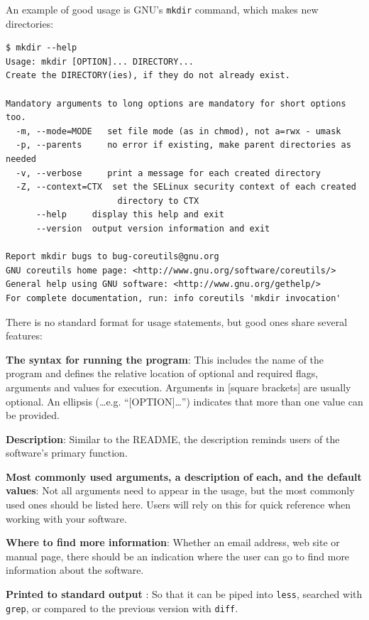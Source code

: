 \documentclass[10pt,letterpaper]{article}
\begin{document}
An example of good usage is GNU's \texttt{mkdir} command, which makes
new directories:

\begin{small}
\begin{verbatim}
$ mkdir --help
Usage: mkdir [OPTION]... DIRECTORY...
Create the DIRECTORY(ies), if they do not already exist.

Mandatory arguments to long options are mandatory for short options too.
  -m, --mode=MODE   set file mode (as in chmod), not a=rwx - umask
  -p, --parents     no error if existing, make parent directories as needed
  -v, --verbose     print a message for each created directory
  -Z, --context=CTX  set the SELinux security context of each created
                      directory to CTX
      --help     display this help and exit
      --version  output version information and exit

Report mkdir bugs to bug-coreutils@gnu.org
GNU coreutils home page: <http://www.gnu.org/software/coreutils/>
General help using GNU software: <http://www.gnu.org/gethelp/>
For complete documentation, run: info coreutils 'mkdir invocation'
\end{verbatim}
\end{small}

There is no standard format for usage statements, but good ones share
several features:

\textbf{The syntax for running the program}: This includes the name of the
program and defines the relative
location of optional and required flags, arguments and values for execution.
Arguments in {[}square brackets{]}
are usually optional. An ellipsis (\ldots e.g. ``{[}OPTION{]}\ldots{}'')
indicates that more than one value can be provided.

\textbf{Description}: Similar to the README, the
description reminds users of the software's primary function.

\textbf{Most commonly used arguments, a description of each, and the
default values}: Not all arguments need to appear in the usage, but the most
commonly used ones should be listed here. Users will rely on this for
quick reference when working with your software.

\textbf{Where to find more information}: Whether an email address, web
site or manual page, there should be an indication where the user can go
to find more information about the software.

\textbf{Printed to standard output} : So that it can be piped into
\texttt{less}, searched with \texttt{grep}, or compared to the previous
version with \texttt{diff}.
\end{document}
